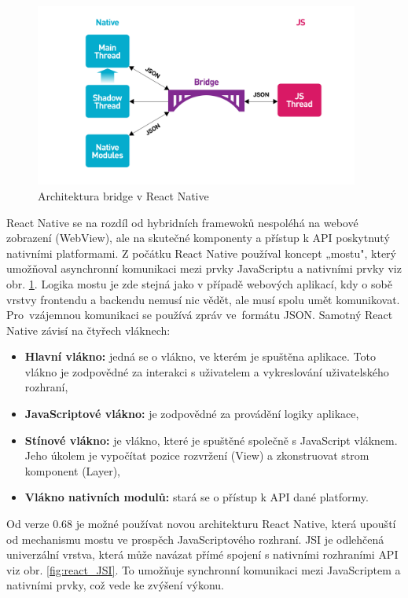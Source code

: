 \documentclass[czech, bc, kiv, he, iso690numb]{fasthesis}
\begin{document}
\begin{figure}[h!]
  \centering
  \includegraphics[width=0.95\textwidth]{img/BP-Runt/Technologies/react_native_bridge_threads.png}
  \caption{Architektura bridge v React Native \cite{react-bridge-figure}}
  \label{fig:react_bridge}
\end{figure}

React Native se na rozdíl od hybridních framewoků nespoléhá na webové zobrazení (WebView), ale na skutečné komponenty a přístup k \gls{API} poskytnutý nativními platformami. Z počátku React Native používal koncept „mostu", který umožňoval asynchronní komunikaci mezi prvky JavaScriptu a nativními prvky viz obr. \ref{fig:react_bridge}. Logika mostu je zde stejná jako v případě webových aplikací, kdy o sobě vrstvy frontendu a backendu nemusí nic vědět, ale musí spolu umět komunikovat. Pro~vzájemnou komunikaci se používá zpráv ve~formátu \gls{JSON}. Samotný React Native závisí na čtyřech vláknech:

\begin{itemize}
    \itemsep0em 
    \item \textbf{Hlavní vlákno:} jedná se o vlákno, ve kterém je spuštěna aplikace. Toto vlákno je zodpovědné za interakci s uživatelem a vykreslování uživatelského rozhraní,
    \item \textbf{JavaScriptové vlákno:} je zodpovědné za provádění logiky aplikace,
    \item \textbf{Stínové vlákno:} je vlákno, které je spuštěné společně s JavaScript vláknem. Jeho úkolem je vypočítat pozice rozvržení (View) a zkonstruovat strom komponent (Layer), 
    \item \textbf{Vlákno nativních modulů:} stará se o přístup k \gls{API} dané platformy.
\end{itemize}

Od verze 0.68 je možné používat novou architekturu React Native, která upouští od mechanismu mostu ve prospěch JavaScriptového rozhraní. \gls{JSI} je odlehčená univerzální vrstva, která může navázat přímé spojení s nativními rozhraními \gls{API} viz obr. \ref{fig:react_JSI}. To umožňuje synchronní komunikaci mezi JavaScriptem a nativními prvky, což vede ke zvýšení výkonu. \cite{what-is-react-native} \cite{medium-how-react-works}
\end{document}
